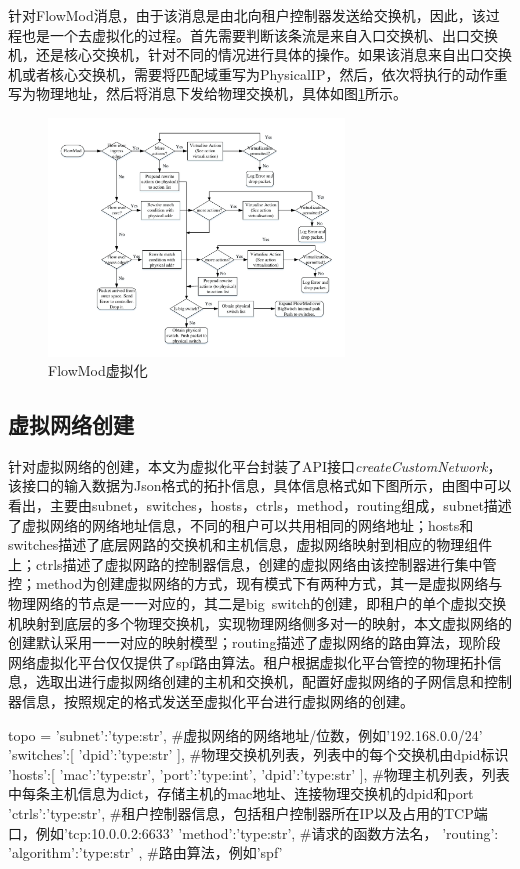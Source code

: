 针对FlowMod消息，由于该消息是由北向租户控制器发送给交换机，因此，该过程也是一个去虚拟化的过程。首先需要判断该条流是来自入口交换机、出口交换机，还是核心交换机，针对不同的情况进行具体的操作。如果该消息来自出口交换机或者核心交换机，需要将匹配域重写为PhysicalIP，然后，依次将执行的动作重写为物理地址，然后将消息下发给物理交换机，具体如图\ref{fig:flowmod}所示。

\begin{figure}[!htb]
  \centering
  \includegraphics[width=0.7\textwidth]{logo/FlowMod}
  \caption{FlowMod虚拟化}
  \label{fig:flowmod}
\end{figure}
\subsection{虚拟网络创建}
针对虚拟网络的创建，本文为虚拟化平台封装了API接口\emph{createCustomNetwork}，该接口的输入数据为Json格式的拓扑信息，具体信息格式如下图所示，由图中可以看出，主要由subnet，switches，hosts，ctrls，method，routing组成，subnet描述了虚拟网络的网络地址信息，不同的租户可以共用相同的网络地址；hosts和switches描述了底层网路的交换机和主机信息，虚拟网络映射到相应的物理组件上；ctrls描述了虚拟网路的控制器信息，创建的虚拟网络由该控制器进行集中管控；method为创建虚拟网络的方式，现有模式下有两种方式，其一是虚拟网络与物理网络的节点是一一对应的，其二是big\ switch的创建，即租户的单个虚拟交换机映射到底层的多个物理交换机，实现物理网络侧多对一的映射，本文虚拟网络的创建默认采用一一对应的映射模型；routing描述了虚拟网络的路由算法，现阶段网络虚拟化平台仅仅提供了spf路由算法。租户根据虚拟化平台管控的物理拓扑信息，选取出进行虚拟网络创建的主机和交换机，配置好虚拟网络的子网信息和控制器信息，按照规定的格式发送至虚拟化平台进行虚拟网络的创建。

\begin{python} 
topo = {
	'subnet':'type:str', #虚拟网络的网络地址/位数，例如'192.168.0.0/24'
	'switches':[
		{
			'dpid':'type:str'
		}
	], #物理交换机列表，列表中的每个交换机由dpid标识
	'hosts':[
		{
			'mac':'type:str',
			'port':'type:int',
			'dpid':'type:str'
		}
	], #物理主机列表，列表中每条主机信息为dict，存储主机的mac地址、连接物理交换机的dpid和port
	'ctrls':'type:str', #租户控制器信息，包括租户控制器所在IP以及占用的TCP端口，例如'tcp:10.0.0.2:6633'
	'method':'type:str', #请求的函数方法名，
	'routing':{
		'algorithm':'type:str'
	}, #路由算法，例如'spf'
}
\end{python}

